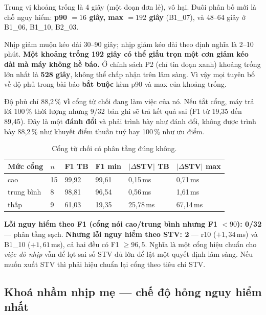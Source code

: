 \begin{canhbao}[title={Tổng phần trăm không phải con số quan trọng nhất --- độ dài khoảng trống mới là}]
Trung vị khoảng trống là 4 giây (một đoạn đơn lẻ), vô hại. Đuôi phân bố mới là chỗ nguy hiểm:
\textbf{p90 $= 16$ giây, max $= 192$ giây} (B1\_07), và 48--64 giây ở B1\_06, B1\_10, B2\_03.

Nhịp giảm muộn kéo dài 30--90 giây; nhịp giảm kéo dài theo định nghĩa là 2--10 phút.
\textbf{Một khoảng trống 192 giây có thể giấu trọn một cơn giảm kéo dài mà máy không hề báo.}
Ở chính sách P2 (chỉ tin đoạn xanh) khoảng trống lớn nhất là \textbf{528 giây}, không thể chấp nhận
trên lâm sàng. Vì vậy mọi tuyên bố về độ phủ trong bài báo \textbf{bắt buộc} kèm p90 và max của khoảng
trống.
\end{canhbao}

Độ phủ chỉ 88,2\,\% \textbf{vì} cổng từ chối đang làm việc của nó. Nếu tắt cổng, máy trả lời 100\,\%
thời lượng nhưng 9/32 bản ghi sẽ trả kết quả sai (F1 từ 19,35 đến 89,45). Đây là một \textbf{đánh đổi}
và phải trình bày như đánh đổi, không được trình bày 88,2\,\% như khuyết điểm thuần tuý hay 100\,\%
như ưu điểm.

\begin{table}[H]\centering\small
\caption{Cổng từ chối có phân tầng đúng không.}
\label{tab:cong_tang}
\begin{tabular}{@{}L{2.8cm} C{0.9cm} C{1.6cm} C{1.6cm} C{2.4cm} C{2.4cm}@{}}
\toprule
\textbf{Mức cổng} & $n$ & \textbf{F1 TB} & \textbf{F1 min} & \textbf{$|\Delta$STV$|$ TB} &
\textbf{$|\Delta$STV$|$ max} \\
\midrule
cao & 15 & 99,92 & 99,61 & 0,15\,ms & 0,71\,ms \\
trung bình & 8 & 98,81 & 96,54 & 0,56\,ms & 1,61\,ms \\
thấp & 9 & 61,03 & 19,35 & 25,78\,ms & 67,14\,ms \\
\bottomrule
\end{tabular}
\end{table}

\textbf{Lỗi nguy hiểm theo F1 (cổng nói cao/trung bình nhưng F1 $< 90$): 0/32} --- phân tầng sạch.
\textbf{Nhưng lỗi nguy hiểm theo STV: 2} --- r10 ($+1{,}34$\,ms) và B1\_10 ($+1{,}61$\,ms), cả hai đều có
F1 $\geq 96{,}5$. Nghĩa là một cổng hiệu chuẩn cho \textit{việc dò nhịp} vẫn để lọt sai số STV đủ lớn để
lật một quyết định lâm sàng. Nếu muốn xuất STV thì phải hiệu chuẩn lại cổng theo tiêu chí STV.

\subsection{Khoá nhầm nhịp mẹ --- chế độ hỏng nguy hiểm nhất}

